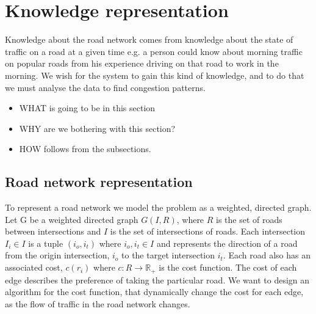 \section{Knowledge representation}
Knowledge about the road network comes from knowledge about the state of traffic on a road at a given time e.g. a  person could know about morning traffic on popular roads from his experience driving on that road to work in the morning. We wish for the system to gain this kind of knowledge, and to do that we must analyse the data to find congestion patterns.
\begin{itemize}
\item WHAT is going to be in this section
\item WHY are we bothering with this section?
\item HOW follows from the subsections.
\end{itemize}
\subsection{Road network representation}
To represent a road network we model the problem as a weighted, directed graph. \\
Let G be a weighted directed graph $G(I,R)$, where $R$ is the set of roads between intersections and $I$ is the set of intersections of roads. Each intersection $I_i \in I$ is a tuple $(i_o, i_t)$ where $i_o, i_t \in I$ and represents the direction of a road from the origin intersection, $i_o$ to the target intersection $i_t$. Each road also has an associated cost, $c(r_i)$ where  $c: R \rightarrow \mathbb R_+$ is the cost function. The cost of each edge describes the preference of taking the particular road. 
We want to design an algorithm for the cost function, that dynamically change the cost for each edge, as the flow of traffic in the road network changes.

